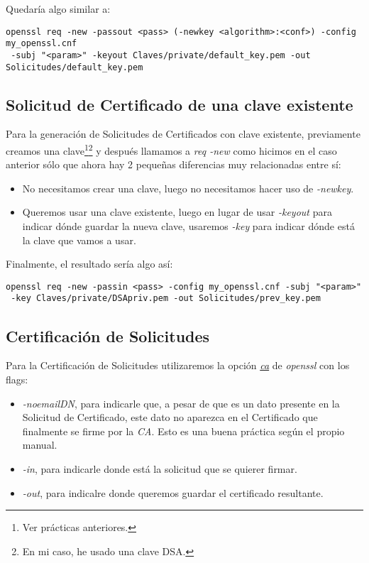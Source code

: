 \documentclass[a4paper, 11pt]{article}
\begin{document}
		Quedaría algo similar a:\\
		\begin{small}
			\verb|openssl req -new -passout <pass> (-newkey <algorithm>:<conf>) -config my_openssl.cnf|\\
			\verb| -subj "<param>" -keyout Claves/private/default_key.pem -out Solicitudes/default_key.pem|\\
		\end{small}
	
	\subsection{Solicitud de Certificado de una clave existente}
		Para la generación de Solicitudes de Certificados con clave existente, previamente creamos una clave\footnote{Ver
		prácticas anteriores.}\footnote{En mi caso, he usado una clave DSA.} y después llamamos a \textit{req -new} como
		hicimos en el caso anterior sólo que ahora hay 2 pequeñas diferencias muy relacionadas entre sí:
		\begin{itemize}
			\item No necesitamos crear una clave, luego no necesitamos hacer uso de \textit{-newkey}.
			
			\item Queremos usar una clave existente, luego en lugar de usar \textit{-keyout} para indicar dónde guardar la
			nueva clave, usaremos \textit{-key} para indicar dónde está la clave que vamos a usar.
		\end{itemize}
		
		Finalmente, el resultado sería algo así:\\
		\begin{small}
			\verb|openssl req -new -passin <pass> -config my_openssl.cnf -subj "<param>"|\\
			\verb| -key Claves/private/DSApriv.pem -out Solicitudes/prev_key.pem|\\
		\end{small}
	
	\subsection{Certificación de Solicitudes}
		Para la Certificación de Solicitudes utilizaremos la opción \href{https://www.openssl.org/docs/man1.0.2/apps/ca.html}
		{\textit{ca}} de \textit{openssl} con los flags:
		\begin{itemize}
			\item \textit{-noemailDN}, para indicarle que, a pesar de que es un dato presente en la Solicitud de Certificado,
			este dato no aparezca en el Certificado que finalmente se firme por la \textit{CA}. Esto es una buena práctica
			según el propio manual.
			\item \textit{-in}, para indicarle donde está la solicitud que se quierer firmar.
			\item \textit{-out}, para indicalre donde queremos guardar el certificado resultante.
		\end{itemize}
		
\end{document}
